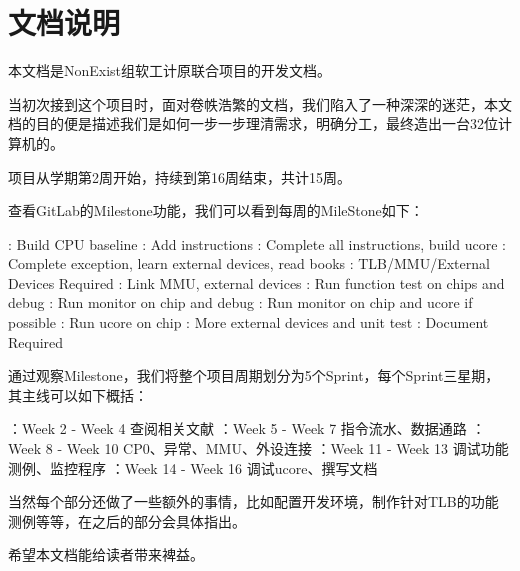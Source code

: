 \chapter{文档说明}

本文档是NonExist组软工计原联合项目的开发文档。

当初次接到这个项目时，面对卷帙浩繁的文档，我们陷入了一种深深的迷茫，本文档的目的便是描述我们是如何一步一步理清需求，明确分工，最终造出一台32位计算机的。

项目从学期第2周开始，持续到第16周结束，共计15周。

查看GitLab的Milestone功能，我们可以看到每周的MileStone如下：
    
    \begin{enumerate}
        : Build CPU baseline
        : Add instructions
        : Complete all instructions, build ucore
        : Complete exception, learn external devices, read books
        : TLB/MMU/External Devices Required
        : Link MMU, external devices
        : Run function test on chips and debug
        : Run monitor on chip and debug
        : Run monitor on chip and ucore if possible
        : Run ucore on chip
        : More external devices and unit test
        : Document Required
    \end{enumerate}

通过观察Milestone，我们将整个项目周期划分为5个Sprint，每个Sprint三星期，其主线可以如下概括：

    \begin{enumerate}
        ：Week 2 - Week 4 查阅相关文献
        ：Week 5 - Week 7 指令流水、数据通路
        ：Week 8 - Week 10 CP0、异常、MMU、外设连接
        ：Week 11 - Week 13 调试功能测例、监控程序
        ：Week 14 - Week 16 调试ucore、撰写文档
    \end{enumerate}

当然每个部分还做了一些额外的事情，比如配置开发环境，制作针对TLB的功能测例等等，在之后的部分会具体指出。

希望本文档能给读者带来裨益。
